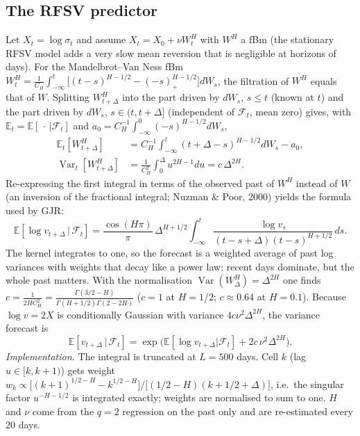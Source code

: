 \documentclass[11pt,a4paper]{article}
\begin{document}
\subsection{The RFSV predictor}
Let $X_t=\log\sigma_t$ and assume $X_t=X_0+\nu W^H_t$ with $W^H$ a fBm (the stationary RFSV model adds a
very slow mean reversion that is negligible at horizons of days). For the Mandelbrot--Van Ness fBm
$W^H_t=\frac{1}{C_H}\int_{-\infty}^t\big[(t-s)^{H-1/2}-(-s)_+^{H-1/2}\big]dW_s$, the filtration of $W^H$
equals that of $W$. Splitting $W^H_{t+\Delta}$ into the part driven by $dW_s$, $s\le t$ (known at $t$) and
the part driven by $dW_s$, $s\in(t,t+\Delta]$ (independent of $\mathcal F_t$, mean zero) gives, with $\mathbb E_t=\mathbb E[\,\cdot\,|\mathcal F_t]$ and $a_0=C_H^{-1}\int_{-\infty}^0(-s)^{H-1/2}dW_s$,
\begin{align}
\mathbb E_t[W^H_{t+\Delta}]&=C_H^{-1}{\textstyle\int_{-\infty}^t}(t+\Delta-s)^{H-1/2}dW_s-a_0,\\
\operatorname{Var}_t[W^H_{t+\Delta}]&=\frac{1}{C_H^2}\int_0^\Delta u^{2H-1}du=c\,\Delta^{2H}.
\end{align}
Re-expressing the first integral in terms of the observed past of $W^H$ instead of $W$ (an inversion of
the fractional integral; Nuzman \& Poor, 2000) yields the formula used by GJR:
\begin{equation}\label{eq:rfsv}
\mathbb E[\log v_{t+\Delta}\,|\,\mathcal F_t]=\frac{\cos(H\pi)}{\pi}\,\Delta^{H+1/2}
\int_{-\infty}^t\frac{\log v_s}{(t-s+\Delta)(t-s)^{H+1/2}}\,ds .
\end{equation}
The kernel integrates to one, so the forecast is a weighted average of past log variances with weights
that decay like a power law: recent days dominate, but the whole past matters. With the normalisation
$\operatorname{Var}(W^H_\Delta)=\Delta^{2H}$ one finds
$c=\frac{1}{2H C_H^2}=\frac{\Gamma(3/2-H)}{\Gamma(H+1/2)\Gamma(2-2H)}$ ($c=1$ at $H=1/2$; $c\approx0.64$ at $H=0.1$).
Because $\log v=2X$ is conditionally Gaussian with variance $4c\nu^2\Delta^{2H}$, the variance forecast is
\begin{equation}\label{eq:var}
\mathbb E[v_{t+\Delta}\,|\,\mathcal F_t]=\exp\Big(\mathbb E[\log v_{t+\Delta}|\mathcal F_t]+2c\,\nu^2\Delta^{2H}\Big).
\end{equation}
\emph{Implementation.} The integral is truncated at $L=500$ days. Cell $k$ (lag $u\in[k,k+1)$) gets weight
$w_k\propto\big[(k+1)^{1/2-H}-k^{1/2-H}\big]/\big[(1/2-H)(k+1/2+\Delta)\big]$, i.e.\ the singular factor
$u^{-H-1/2}$ is integrated exactly; weights are normalised to sum to one. $H$ and $\nu$ come from the $q=2$
regression on the past only and are re-estimated every 20 days.
\end{document}
